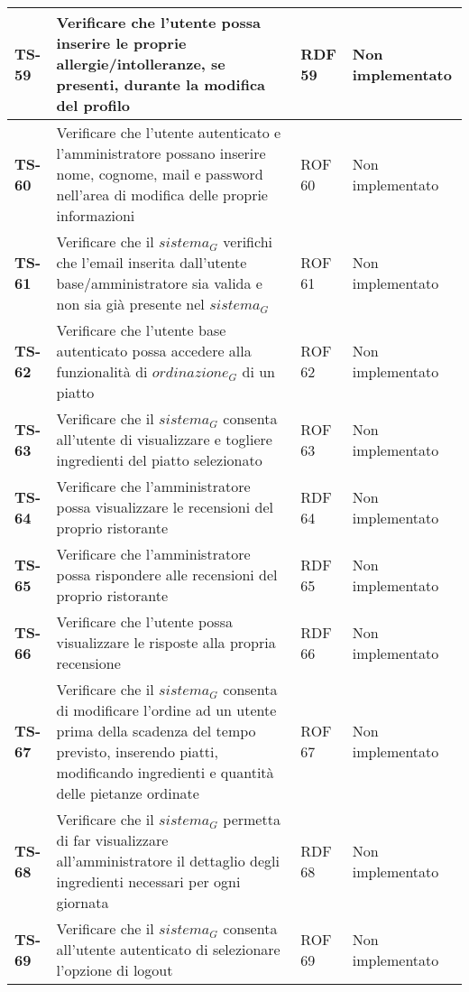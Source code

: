 \begin{longtable}{|>{\centering\arraybackslash}p{1.5cm}|p{9.8cm}|p{2cm}|p{3.5cm}|}
    \hline
    \rowcolor{gray!10}
    \textbf{TS-59} & Verificare che l'utente possa inserire le proprie allergie/intolleranze, se presenti, durante la modifica del profilo & RDF 59 & Non implementato \\ 
    \hline
    \rowcolor{gray!10}
    \textbf{TS-60} & Verificare che l'utente autenticato e l'amministratore possano inserire nome, cognome, mail e password nell'area di modifica delle proprie informazioni & ROF 60 & Non implementato \\ 
    \hline
    \rowcolor{gray!10}
    \textbf{TS-61} & Verificare che il $\textit{sistema}_G$ verifichi che l'email inserita dall'utente base/amministratore sia valida e non sia già presente nel $\textit{sistema}_G$ & ROF 61 & Non implementato \\ 
    \hline
    \rowcolor{gray!10}
    \textbf{TS-62} & Verificare che l'utente base autenticato possa accedere alla funzionalità di $\textit{ordinazione}_G$ di un piatto & ROF 62 & Non implementato \\
    \hline
    \rowcolor{gray!10}
    \textbf{TS-63} & Verificare che il $\textit{sistema}_G$ consenta all'utente di visualizzare e togliere ingredienti del piatto selezionato & ROF 63 & Non implementato \\
    \hline
    \rowcolor{gray!10}
    \textbf{TS-64} & Verificare che l'amministratore possa visualizzare le recensioni del proprio ristorante & RDF 64 & Non implementato \\ 
    \hline
    \rowcolor{gray!10}
    \textbf{TS-65} & Verificare che l'amministratore possa rispondere alle recensioni del proprio ristorante & RDF 65 & Non implementato \\ 
    \hline
    \rowcolor{gray!10}
    \textbf{TS-66} & Verificare che l'utente possa visualizzare le risposte alla propria recensione & RDF 66 & Non implementato \\
    \hline
    \rowcolor{gray!10}
    \textbf{TS-67} & Verificare che il $\textit{sistema}_G$ consenta di modificare l'ordine ad un utente prima della scadenza del tempo previsto, inserendo piatti, modificando ingredienti e quantità delle pietanze ordinate & ROF 67 & Non implementato \\ 
    \hline
    \rowcolor{gray!10}
    \textbf{TS-68} & Verificare che il $\textit{sistema}_G$ permetta di far visualizzare all'amministratore il dettaglio degli ingredienti necessari per ogni giornata & RDF 68 & Non implementato \\ 
    \hline
    \rowcolor{gray!10}
    \textbf{TS-69} & Verificare che il $\textit{sistema}_G$ consenta all'utente autenticato di selezionare l'opzione di logout & ROF 69 & Non implementato \\

\end{longtable}
